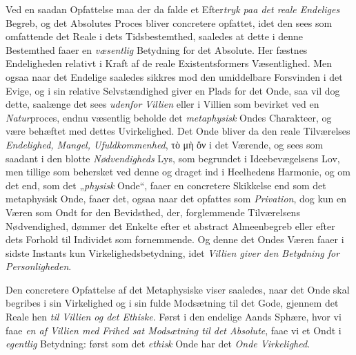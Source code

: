 Ved en saadan Opfattelse maa der da falde et Efter\emph{tryk paa det reale
Endeliges} Begreb, og det Absolutes Proces bliver concretere opfattet, idet den
sees som omfattende det Reale i dets Tidsbestemthed, saaledes at dette i denne
Bestemthed faaer en \emph{væsentlig} Betydning for det Absolute. Her fæstnes
Endeligheden relativt i Kraft af de reale Existentsformers Væsentlighed. Men
ogsaa naar det Endelige saaledes sikkres mod den umiddelbare Forsvinden i det
Evige, og i sin relative Selvstændighed giver en Plads for det Onde, saa vil dog
dette, saalænge det sees \emph{udenfor}
 \emph{Villien} eller i Villien som bevirket ved en \emph{Natur}proces, endnu
væsentlig beholde det \emph{metaphysisk} Ondes Charakteer, og være behæftet med
dettes Uvirkelighed. Det Onde bliver da den reale Tilværelses \emph{Endelighed,
Mangel, Ufuldkommenhed}, τὸ μὴ ὄν i det Værende, og sees som saadant i den
blotte \emph{Nødvendigheds} Lys, som begrundet i Ideebevægelsens Lov, men
tillige som behersket ved denne og draget ind i Heelhedens Harmonie, og om det
end, som det „\emph{physisk} Onde“, faaer en concretere Skikkelse end som det
metaphysisk Onde, faaer det, ogsaa naar det opfattes som \emph{Privation}, dog
kun en Væren som Ondt for den Bevidsthed, der, forglemmende Tilværelsens
Nødvendighed, dømmer det Enkelte efter et abstract Almeenbegreb eller efter dets
Forhold til Individet som fornemmende. Og denne det Ondes Væren faaer i sidste
Instants kun Virkelighedsbetydning, idet \emph{Villien giver den Betydning for
Personligheden}.

Den concretere Opfattelse af det Metaphysiske viser saaledes, naar det Onde skal
begribes i sin Virkelighed og i sin fulde Modsætning til det Gode, gjennem det
Reale hen \emph{til Villien og det Ethiske}. Først i den endelige Aands Sphære,
hvor vi faae \emph{en af Villien med Frihed sat Modsætning til det Absolute},
faae vi et Ondt i \emph{egentlig} Betydning: først som det \emph{ethisk} Onde
har det \emph{Onde Virkelighed}.

